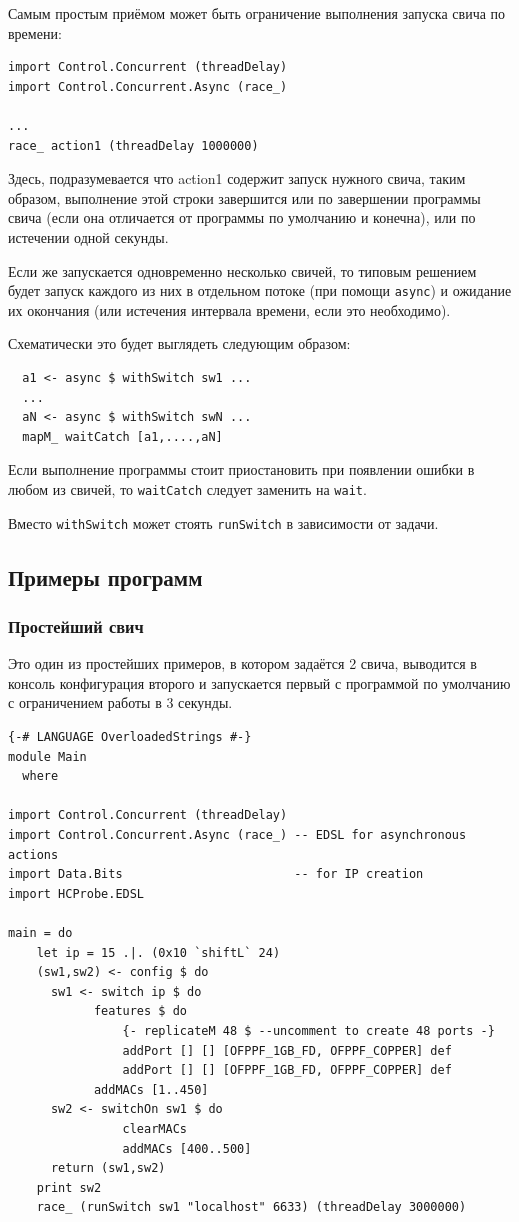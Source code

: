 \documentclass[9pt,a4paper]{article}
\begin{document}
Самым простым приёмом может быть ограничение выполнения запуска свича по времени:

\begin{lstlisting}
import Control.Concurrent (threadDelay)
import Control.Concurrent.Async (race_)

...
race_ action1 (threadDelay 1000000)
\end{lstlisting}

Здесь, подразумевается что action1 содержит запуск нужного свича, таким образом,
выполнение этой строки завершится или по завершении программы свича (если она
отличается от программы по умолчанию и конечна), или по истечении одной секунды.

Если же запускается одновременно несколько свичей, то типовым решением будет
запуск каждого из них в отдельном потоке (при помощи \lstinline!async!) и ожидание
их окончания (или истечения интервала времени, если это необходимо).

Схематически это будет выглядеть следующим образом:

\begin{lstlisting}
  a1 <- async $ withSwitch sw1 ...
  ...
  aN <- async $ withSwitch swN ...
  mapM_ waitCatch [a1,....,aN]
\end{lstlisting}

Если выполнение программы стоит приостановить при появлении ошибки в любом из
свичей, то \lstinline!waitCatch! следует заменить на \lstinline!wait!.

Вместо \lstinline!withSwitch! может стоять \lstinline!runSwitch!
в зависимости от задачи.

\subsection{Примеры программ}

\subsubsection{Простейший свич}

Это один из простейших примеров, в котором задаётся 2 свича,
выводится в консоль конфигурация второго и запускается
первый с программой по умолчанию с ограничением работы
в 3 секунды.

\begin{lstlisting}
{-# LANGUAGE OverloadedStrings #-}
module Main
  where

import Control.Concurrent (threadDelay)
import Control.Concurrent.Async (race_) -- EDSL for asynchronous actions
import Data.Bits                        -- for IP creation
import HCProbe.EDSL

main = do 
    let ip = 15 .|. (0x10 `shiftL` 24)
    (sw1,sw2) <- config $ do
      sw1 <- switch ip $ do
            features $ do
                {- replicateM 48 $ --uncomment to create 48 ports -}
                addPort [] [] [OFPPF_1GB_FD, OFPPF_COPPER] def
                addPort [] [] [OFPPF_1GB_FD, OFPPF_COPPER] def
            addMACs [1..450]
      sw2 <- switchOn sw1 $ do
                clearMACs 
                addMACs [400..500]
      return (sw1,sw2)
    print sw2
    race_ (runSwitch sw1 "localhost" 6633) (threadDelay 3000000)
\end{lstlisting}
\end{document}
